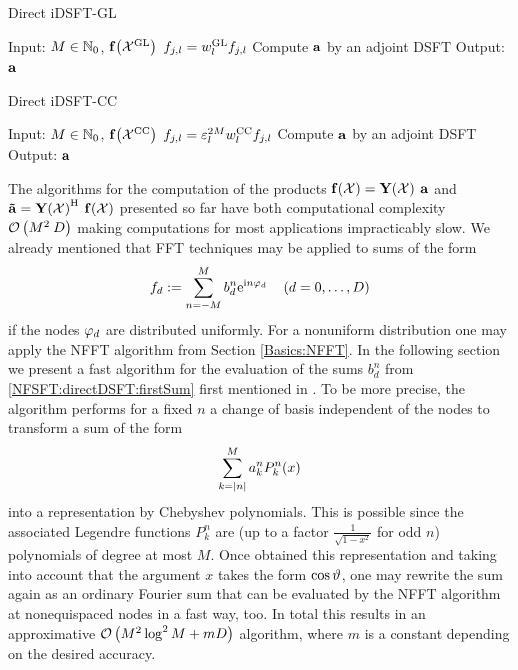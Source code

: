 \begin{algorithm}[htb]
  \caption{Direct iDSFT-GL}
  \label{NFSFT:directIDSFTGL}    
  \begin{algorithmic}
    \STATE Input: $M \in \mathbb{N}_{0}$, $\mathbf{f}{\hspace{-0.4ex}}\left(\mathcal{X}^{\mbox{\scriptsize\rm{GL}}}\right)$
    \STATE
        \STATE $f_{j,l} = w^{\mbox{\scriptsize\rm{GL}}}_{l} f_{j,l}$ 
      \ENDFOR
    \ENDFOR
    \STATE Compute $\mathbf{a}$ by an adjoint DSFT
    \STATE
    \STATE Output: $\mathbf{a}$
  \end{algorithmic}
\end{algorithm}
\begin{algorithm}[htb]
  \caption{Direct iDSFT-CC}
  \label{NFSFT:directIDSFTCC}    
  \begin{algorithmic}
    \STATE Input: $M \in \mathbb{N}_{0}$, $\mathbf{f}{\hspace{-0.4ex}}\left(\mathcal{X}^{\mbox{\scriptsize\rm{CC}}}\right)$
    \STATE
        \STATE $f_{j,l} = \varepsilon_{l}^{2M} w^{\mbox{\scriptsize\rm{CC}}}_{l} f_{j,l}$ 
      \ENDFOR
    \ENDFOR
    \STATE Compute $\mathbf{a}$ by an adjoint DSFT
    \STATE
    \STATE Output: $\mathbf{a}$
  \end{algorithmic}
\end{algorithm}

The algorithms for the computation of the products $\mathbf{f}{\hspace{-0.4ex}}\left(\mathcal{X}\right) = \mathbf{Y}{\hspace{-0.4ex}}\left(\mathcal{X}\right) \: \mathbf{a}$ and $\mathbf{\tilde{a}} = \mathbf{Y}{\hspace{-0.4ex}}\left(\mathcal{X}\right)^{\text{\rm{H}}} \: \mathbf{f}{\hspace{-0.4ex}}\left(\mathcal{X}\right)$ presented so far have both computational complexity $\mathcal{O}\left(M^2\:D\right)$ making computations for most applications impracticably slow. We already mentioned that FFT techniques may be applied to sums of the form
\[
  f_{d} := \sum_{n = -M}^M b^n_d \mbox{\rm{e}}^{\mbox{\scriptsize\rm{i}} n \varphi_{d}} \quad \left(d = 0,\ldots,D\right)
\]
if the nodes $\varphi_d$ are distributed uniformly. For a nonuniform distribution one may apply the NFFT algorithm from Section \ref{Basics:NFFT}. In the following section we present a fast algorithm for the evaluation of the sums $b^{n}_{d}$ from \eqref{NFSFT:directDSFT:firstSum} first mentioned in \cite{postta97}. To be more precise, the algorithm performs for a fixed $n$ a change of basis independent of the nodes to transform a sum of the form
\begin{equation}
  \label{NFSFT:LegendreSum}
  \sum_{k=\left\vert n\right\vert}^M a_{k}^n P_{k}^n{\hspace{-0.4ex}}\left(x\right)
\end{equation}
into a representation by Chebyshev polynomials. This is possible since the associated Legendre functions $P_{k}^n$ are (up to a factor $\frac{1}{\sqrt{1-x^2}}$ for odd $n$) polynomials of degree at most $M$. Once obtained this representation and taking into account that the argument $x$ takes the form $\cos \vartheta$, one may rewrite the sum again as an ordinary Fourier sum that can be evaluated by the NFFT algorithm at nonequispaced nodes in a fast way, too. In total this results in an approximative $\mathcal{O}\left(M^2 \log^2 M + mD\right)$ algorithm, where $m$ is a constant depending on the desired accuracy. 

